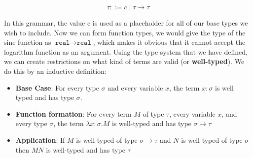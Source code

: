 \documentclass[11pt]{article}
\begin{document}
	\[ \tau ::= c \; | \; \tau \rightarrow \tau \]
	
	\par In this grammar, the value c is used as a placeholder for all of our base types we wish to include. Now we can form function types, we would give the type of the sine function as $\texttt{real} \rightarrow \texttt{real}$, which makes it obvious that it cannot accept the logarithm function as an argument. Using the type system that we have defined, we can create restrictions on what kind of terms are valid (or \textbf{well-typed}). We do this by an inductive definition:
	\begin{itemize}
		\item \textbf{Base Case}: For every type $\sigma$ and every variable $x$, the term $x:\sigma$ is well typed and has type $\sigma$.
		\item \textbf{Function formation}: For every term $M$ of type $\tau$, every variable $x$, and every type $\sigma$, the term $\lambda x:\sigma .M$ is well-typed and has type $\sigma \rightarrow \tau$
		\item \textbf{Application}: If $M$ is well-typed of type $\sigma \rightarrow \tau$ and $N$ is well-typed of type $\sigma$ then $M N$ is well-typed and has type $\tau$
	\end{itemize}	
	
	
	\newpage
	\printindex
\end{document}
